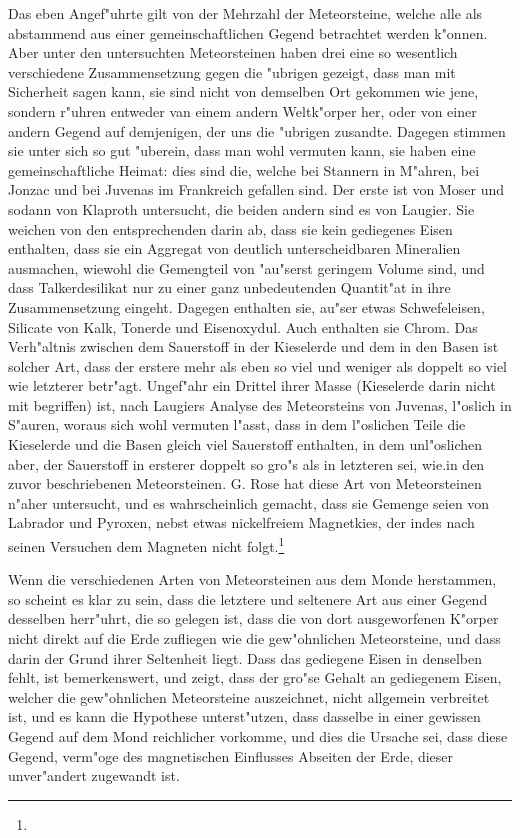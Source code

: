 \documentclass[a4paper, 11pt, oneside]{article}
\begin{document}
Das eben Angef"uhrte gilt von der Mehrzahl der Meteorsteine, welche alle als abstammend aus einer gemeinschaftlichen Gegend betrachtet werden k"onnen. Aber unter den untersuchten Meteorsteinen haben drei eine so wesentlich verschiedene Zusammensetzung gegen die "ubrigen gezeigt, dass man mit Sicherheit sagen kann, sie sind nicht von demselben Ort gekommen wie jene, sondern r"uhren entweder van einem andern Weltk"orper her, oder von einer andern Gegend auf demjenigen, der uns die "ubrigen zusandte. Dagegen stimmen sie unter sich so gut "uberein, dass man wohl vermuten kann, sie haben eine gemeinschaftliche Heimat: dies sind die, welche bei Stannern in M"ahren, bei Jonzac und bei Juvenas im Frankreich gefallen sind. Der erste ist von Moser und sodann von Klaproth untersucht, die beiden andern sind es von Laugier. Sie weichen von den entsprechenden darin ab, dass sie kein gediegenes Eisen enthalten, dass sie ein Aggregat von deutlich unterscheidbaren Mineralien ausmachen, wiewohl die Gemengteil von "au"serst geringem Volume sind, und dass Talkerdesilikat nur zu einer ganz unbedeutenden Quantit"at in ihre Zusammensetzung eingeht. Dagegen enthalten sie, au"ser etwas Schwefeleisen, Silicate von Kalk, Tonerde und Eisenoxydul. Auch enthalten sie Chrom. Das Verh"altnis zwischen dem Sauerstoff in der Kieselerde und dem in den Basen ist solcher Art, dass der erstere mehr als eben so viel und weniger als doppelt so viel wie letzterer betr"agt. Ungef"ahr ein Drittel ihrer Masse (Kieselerde darin nicht mit begriffen) ist, nach Laugiers Analyse des Meteorsteins von Juvenas, l"oslich in S"auren, woraus sich wohl vermuten l"asst, dass in dem l"oslichen Teile die Kieselerde und die Basen gleich viel Sauerstoff enthalten, in dem unl"oslichen aber, der Sauerstoff in ersterer doppelt so gro"s als in letzteren sei, wie.in den zuvor beschriebenen Meteorsteinen. G. Rose hat diese Art von Meteorsteinen n"aher untersucht, und es wahrscheinlich gemacht, dass sie Gemenge seien von Labrador und Pyroxen, nebst etwas nickelfreiem Magnetkies, der indes nach seinen Versuchen dem Magneten nicht folgt.\footnote{}

Wenn die verschiedenen Arten von Meteorsteinen aus dem Monde herstammen, so scheint es klar zu sein, dass die letztere und seltenere Art aus einer Gegend desselben herr"uhrt, die so gelegen ist, dass die von dort ausgeworfenen K"orper nicht direkt auf die Erde zufliegen wie die gew"ohnlichen Meteorsteine, und dass darin der Grund ihrer Seltenheit liegt. Dass das gediegene Eisen in denselben fehlt, ist bemerkenswert, und zeigt, dass der gro"se Gehalt an gediegenem Eisen, welcher die gew"ohnlichen Meteorsteine auszeichnet, nicht allgemein verbreitet ist, und es kann die Hypothese unterst"utzen, dass dasselbe in einer gewissen Gegend auf dem Mond reichlicher vorkomme, und dies die Ursache sei, dass diese Gegend, verm"oge des magnetischen Einflusses Abseiten der Erde, dieser unver"andert zugewandt ist.
\end{document}
